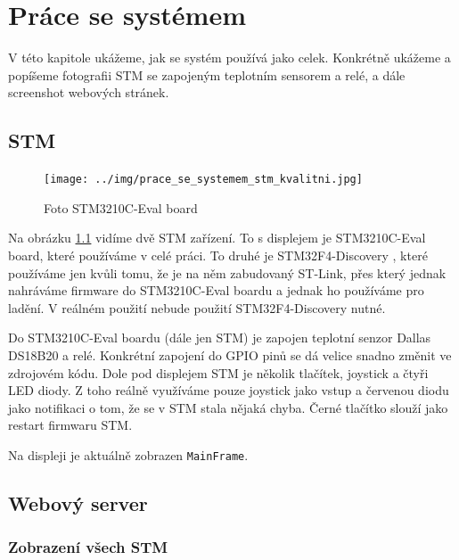 
\chapter{Práce se systémem}
V této kapitole ukážeme, jak se systém používá jako celek.
Konkrétně ukážeme a popíšeme fotografii STM se zapojeným teplotním sensorem a relé, a dále
screenshot webových stránek.

\section{STM}

\begin{figure}[tbh!]
\texttt{[image: ../img/prace\_se\_systemem\_stm\_kvalitni.jpg]}
\caption{Foto STM3210C-Eval board}
\label{stm-foto}
\end{figure}

Na obrázku \ref{stm-foto} vidíme dvě STM zařízení.
To s displejem je STM3210C-Eval board, které používáme v celé práci.
To druhé je STM32F4-Discovery \cite{STM32F4-Discovery}, které používáme jen kvůli tomu, že je na něm
zabudovaný ST-Link, přes který jednak nahráváme firmware do STM3210C-Eval boardu a jednak ho používáme
pro ladění.
V reálném použití nebude použití STM32F4-Discovery nutné.

Do STM3210C-Eval boardu (dále jen STM) je zapojen teplotní senzor Dallas DS18B20 \cite{DS18B20}
a relé.
Konkrétní zapojení do GPIO pinů se dá velice snadno změnit ve zdrojovém kódu.
Dole pod displejem STM je několik tlačítek, joystick a čtyři LED diody.
Z toho reálně využíváme pouze joystick jako vstup a červenou diodu jako notifikaci o tom, že
se v STM stala nějaká chyba.
Černé  tlačítko slouží jako restart firmwaru STM.

Na displeji je aktuálně zobrazen \texttt{MainFrame}.


\section{Webový server}

\subsection{Zobrazení všech STM}

